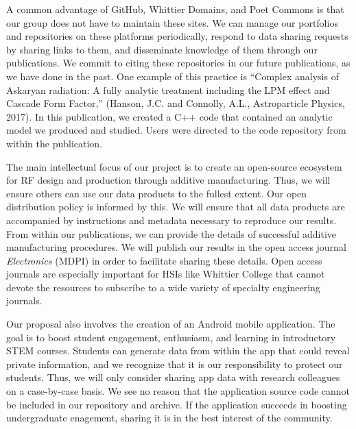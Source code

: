 \documentclass[11pt]{amsart}
\begin{document}
A common advantage of GitHub, Whittier Domains, and Poet Commons is that our group does not have to maintain these sites.  We can manage our portfolios and repositories on these platforms periodically, respond to data sharing requests by sharing links to them, and disseminate knowledge of them through our publications.  We commit to citing these repositories in our future publications, as we have done in the past.  One example of this practice is ``Complex analysis of Askaryan radiation: A fully analytic treatment including the LPM effect and Cascade Form Factor,'' (Hanson, J.C. and Connolly, A.L., Astroparticle Physics, 2017).  In this publication, we created a C++ code that contained an analytic model we produced and studied.  Users were directed to the code repository from within the publication.  

The main intellectual focus of our project is to create an open-source ecosystem for RF design and production through additive manufacturing.  Thus, we will ensure others can use our data products to the fullest extent.  Our open distribution policy is informed by this.  We will ensure that all data products are accompanied by instructions and metadata necessary to reproduce our results.  From within our publications, we can provide the details of successful additive manufacturing procedures.  We will publish our results in the open access journal \textit{Electronics} (MDPI) in order to facilitate sharing these details.  Open access journals are especially important for HSIs like Whittier College that cannot devote the resources to subscribe to a wide variety of specialty engineering journals.  

Our proposal also involves the creation of an Android mobile application.  The goal is to boost student engagement, enthusiasm, and learning in introductory STEM courses.  Students can generate data from within the app that could reveal private information, and we recognize that it is our responsibility to protect our students.  Thus, we will only consider sharing app data with research colleagues on a case-by-case basis.  We see no reason that the application source code cannot be included in our repository and archive.  If the application succeeds in boosting undergraduate enagement, sharing it is in the best interest of the community.

\clearpage



\end{document}
